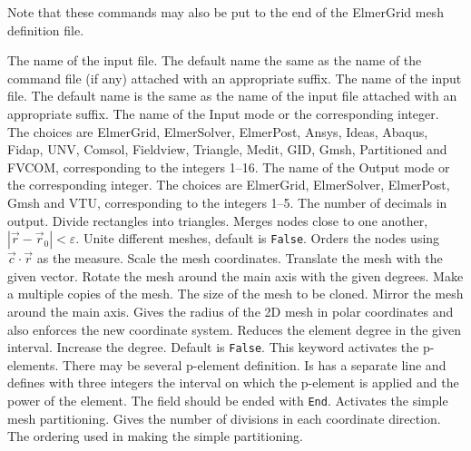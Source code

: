 Note that these commands may also be put to the end of the ElmerGrid mesh 
definition file.

\sifbegin
{}
The name of the input file.
The default name the same as the name of the command file (if any) 
attached with an appropriate suffix. 
%
The name of the input file.
The default name is the same as the name of the input file
attached with an appropriate suffix. 
%
The name of the Input mode or the corresponding integer. 
The choices are ElmerGrid, ElmerSolver, ElmerPost,
Ansys, Ideas, Abaqus, Fidap, UNV, Comsol, Fieldview,
Triangle, Medit, GID, Gmsh, Partitioned and FVCOM,
corresponding to the integers 1--16.
%
The name of the Output mode or the corresponding integer. 
The choices are ElmerGrid, ElmerSolver, ElmerPost,
Gmsh and VTU, corresponding to the integers 1--5.
%
The number of decimals in output.
%
Divide rectangles into triangles.
%
Merges nodes close to one another, $|\vec{r}-\vec{r}_0| < \varepsilon$.
%
Unite different meshes, default is \texttt{False}.
%
Orders the nodes using $\vec{c}\cdot\vec{r}$ as the measure.
%
Scale the mesh coordinates. 
%
Translate the mesh with the given vector.
%
Rotate the mesh around the main axis with the given degrees.
%
Make a multiple copies of the mesh.
%
The size of the mesh to be cloned.
%
Mirror the mesh around the main axis.
%
Gives the radius of the 2D mesh in polar coordinates 
and also enforces the new coordinate system.
%
Reduces the element degree in the given interval.
%
Increase the degree. Default is \texttt{False}.
%
This keyword activates the p-elements. 
There may be several p-element definition. Is 
has a separate line and defines with three integers the interval
on which the p-element is applied and the power of the element.
The field should be ended with \texttt{End}.
%
Activates the simple mesh partitioning.
Gives the number of divisions in each coordinate 
direction.
%
The ordering used in making the simple partitioning.
